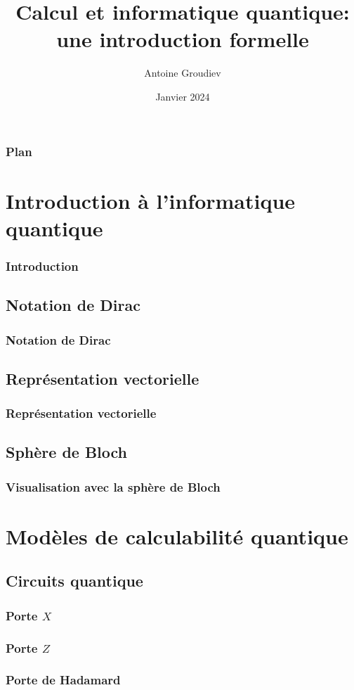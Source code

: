 \documentclass[aspectratio=169]{beamer}
\title{\textbf{Calcul et informatique quantique:\\une introduction formelle}}
\author{Antoine Groudiev}
\institute{ENS Ulm}
\date{Janvier 2024}
\begin{document}
\frame{\titlepage}

\begin{frame}
    \frametitle{Plan}
    \tableofcontents
\end{frame}

\section{Introduction à l'informatique quantique}
\begin{frame}
    \frametitle{Introduction}
\end{frame}

\subsection{Notation de Dirac}
\begin{frame}
    \frametitle{Notation de Dirac}
\end{frame}

\subsection{Représentation vectorielle}
\begin{frame}
    \frametitle{Représentation vectorielle}
\end{frame}

\subsection{Sphère de Bloch}
\begin{frame}
    \frametitle{Visualisation avec la sphère de Bloch}
\end{frame}

\section{Modèles de calculabilité quantique}
\subsection{Circuits quantique}
\begin{frame}
    \frametitle{Porte $X$}
\end{frame}

\begin{frame}
    \frametitle{Porte $Z$}
\end{frame}

\begin{frame}
    \frametitle{Porte de Hadamard}
\end{frame}
\end{document}
